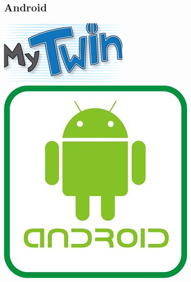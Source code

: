 \documentclass[10pt]{article}
\begin{document}
{{%
\newpage
\begin{flushleft}
\section{Android}
\vspace{0.5in}
\begin{abstract}
\vspace{0.3in}
\large{Este es el primer trabajo de lenguajes de programaci\'on,para el cual las indicaciones fueron las de realizar un proyecto de aplicaci\'on m\'ovil, mas espec\'ifico en Android.\\
Hubieron algunas dificultades al principio, era algo nuevo para todos, a\'un no ten\'iamos clara la idea de lo que se har\'ia.\\
Entre algunas ideas, finalmente surgi\'o MY TWIN, algo que realmente nos pareci\'o novedoso y con alguna utilidad que se puede agregar a un dispositivo m\'ovil.\\
Se trabajo bastante con los recursos del tel\'efono y se hizo mucho \'enfasis en la proyecci\'on de tener un dispositivo con todo personalizado.}
\end{abstract}
\begin{center}
\vspace{0.3in}
\includegraphics[scale=0.5]{logo}\\
\vspace{0.3in}
\includegraphics[scale=0.2]{logAndroid}
\end{center}
\end{flushleft}

}}
\end{document}
